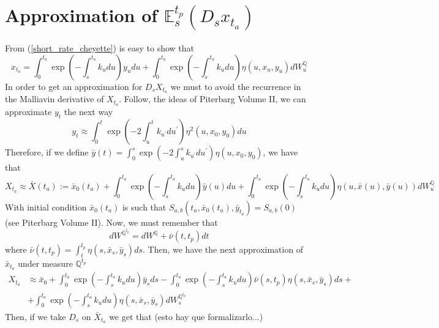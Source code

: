 \documentclass[a4paper,10pt]{article}
\newcommand{\1}{\mathbf{1}}
\begin{document}
\section{Approximation of $\mathbb{E}_s^{t_p}\left(D_s x_{t_a}\right)$}
\label{expected_forward_measure_malliavin_derivative_x_t}
From (\ref{short_rate_cheyette}) is easy to show that
\begin{equation*}
x_{t_a} = \int_{0}^{t_a} \exp\left(-\int_{s}^{t_a}k_u du\right) y_u du + \int_{0}^{t_a}  \exp\left(-\int_{s}^{t_a}k_u du \right) \eta(u,x_u,y_u) dW_u^{\mathbb{Q}}  
\end{equation*}
In order to get an approximation for $D_sX_{t_a}$ we must to avoid the recurrence in the Malliavin derivative of $X_{t_a}$. Follow, the ideas of Piterbarg Volume II, we can approximate $y_t$ the next way
\begin{equation*}
y_t \approx \int_{0}^{t} \exp\left(-2\int_{u}^{t} k_{u^{\prime}} du^{\prime} \right) \eta^{2}(u,x_0,y_0) du
\end{equation*}
Therefore, if we define $\bar{y}(t)= \int_{0}^{s} \exp\left(-2\int_{u}^{s} k_{u^{\prime}} du^{\prime} \right) \eta(u,x_0,y_0)$, we have that
\begin{equation}\label{approximation_x_t_a}
X_{t_a} \approx \bar{X}(t_a):= \bar{x}_0(t_a)  + \int_{0}^{t_a} \exp\left(-\int_{s}^{t_a}k_u du\right) \bar{y}(u) du + \int_{0}^{t_a}  \exp\left(-\int_{s}^{t_a}k_u du \right) \eta(u,\bar{x}(u),\bar{y}(u)) dW_u^{\mathbb{Q}}  
\end{equation}
With initial condition  $\bar{x}_{0}(t_a)$ is such that $S_{a,b}(t_a,\bar{x}_0(t_a), \bar{y}_{t_a}) = S_{a,b}(0)$ (see Piterbarg Volume II). Now, we must remember that 
\begin{equation*}
dW^{\mathbb{Q}^{t_p}} = dW^{\mathbb{Q}} + \bar{\nu}(t,t_p) dt 
\end{equation*}
where $\bar{\nu}(t,t_p) = \int_{t}^{t_p} \eta(s,\bar{x}_s,\bar{y}_s) ds $. Then, we have the next approximation of $\bar{x}_{t_a}$ under measure $\mathbb{Q}^{t_p}$
\begin{align*}
X_{t_a} &\approx \bar{x}_0  + \int_{0}^{t_a} \exp\left(-\int_{s}^{t_a}k_u du\right) \bar{y}_s ds - \int_{0}^{t_a} \exp\left(-\int_{s}^{t_a}k_u du\right) \bar{\nu}(s, t_p) \eta(s,\bar{x}_s,\bar{y}_s) ds +  \\
&+ \int_{0}^{t_a}  \exp\left(-\int_{s}^{t_a}k_u du \right)\eta(s,\bar{x}_s,\bar{y}_s) dW_s^{\mathbb{Q}^{t_p}}  
\end{align*} 
Then, if we take $D_s$ on $\bar{X}_{t_a}$ we get that (esto hay que formalizarlo...)
\end{document}
